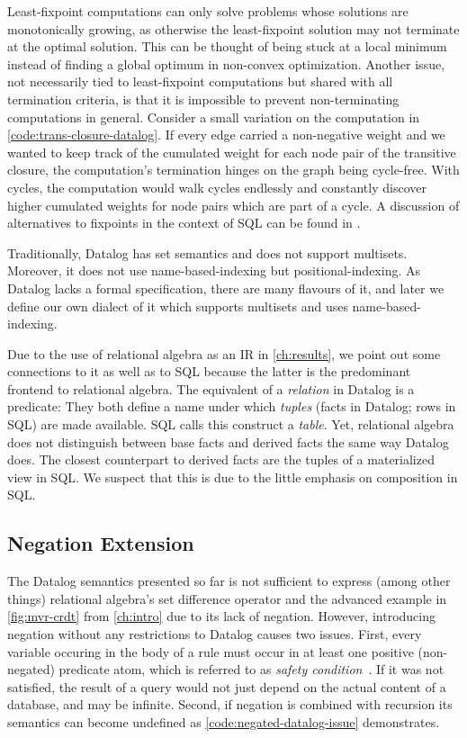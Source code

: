 Least-fixpoint computations can only solve problems whose solutions
are monotonically growing, as otherwise the least-fixpoint solution may not
terminate at the optimal solution.
This can be thought of being stuck at a local minimum instead of finding
a global optimum in non-convex optimization.
Another issue, not necessarily tied to least-fixpoint computations but shared
with all termination criteria, is that it is impossible to prevent
non-terminating computations in general.
Consider a small variation on the computation in \ref{code:trans-closure-datalog}.
If every edge carried a non-negative weight and we wanted to keep track of the
cumulated weight for each node pair of the transitive closure,
the computation's termination hinges on the graph being cycle-free.
With cycles, the computation would walk cycles endlessly and constantly discover
higher cumulated weights for node pairs which are part of a cycle.
A discussion of alternatives to fixpoints in the context of SQL
can be found in \cite{hirn2023fix}.


Traditionally, Datalog has set semantics and does not support multisets.
Moreover, it does not use name-based-indexing but positional-indexing.
As Datalog lacks a formal specification, there are many flavours of it,
and later we define our own dialect of it which supports multisets and
uses name-based-indexing.

Due to the use of relational algebra as an \ac{IR} in \ref{ch:results},
we point out some connections to it as well as to SQL
because the latter is the predominant frontend to relational algebra.
The equivalent of a \emph{relation} in Datalog is a predicate:
They both define a name under which \emph{tuples} (facts in Datalog; rows in SQL)
are made available. SQL calls this construct a \emph{table}.
Yet, relational algebra does not distinguish between base facts and derived facts
the same way Datalog does.
The closest counterpart to derived facts are the tuples of a materialized view
in SQL.
We suspect that this is due to the little emphasis on composition in SQL.

\subsection{Negation Extension}

The Datalog semantics presented so far is not sufficient to express
(among other things) relational algebra's set difference operator
and the advanced example in \ref{fig:mvr-crdt} from \ref{ch:intro}
due to its lack of negation.
However, introducing negation without any restrictions to Datalog causes two issues.
First, every variable occuring in the body of a rule must occur in at least one
positive (non-negated) predicate atom, which is referred to as
\emph{safety condition}~\cite{green2013datalog}.
If it was not satisfied, the result of a query would not just depend on the
actual content of a database, and may be infinite.
Second, if negation is combined with recursion its semantics can become undefined
as \ref{code:negated-datalog-issue} demonstrates.

